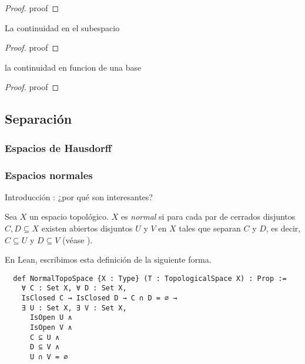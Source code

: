 \begin{proof}
  proof
\end{proof}

\begin{proposition}
  La continuidad en el subespacio
\end{proposition}

\begin{proof}
  proof
\end{proof}

\begin{proposition}
  la continuidad en funcion de una base
\end{proposition}

\begin{proof}
  proof
\end{proof}






\subsection{Separación}



\subsubsection{Espacios de Hausdorff}

\newpage
\subsubsection{Espacios normales}

Introducción : ¿por qué son interesantes?

\begin{definition}
  Sea $X$ un espacio topológico. $X$ es \emph{normal} si para cada par de cerrados disjuntos $C, D \subseteq X$ existen abiertos disjuntos $U$ y $V$ en $X$ tales  que separan $C$ y $D$, es decir, $C \subseteq U$ y $D \subseteq V$ \textnormal{(véase \cite[p. 99]{willard2012general})}.
\end{definition}

En Lean, escribimos esta definición de la siguiente forma.

\begin{lstlisting}
  def NormalTopoSpace {X : Type} (T : TopologicalSpace X) : Prop :=
    ∀ C : Set X, ∀ D : Set X,
    IsClosed C → IsClosed D → C ∩ D = ∅ →
    ∃ U : Set X, ∃ V : Set X,
      IsOpen U ∧
      IsOpen V ∧
      C ⊆ U ∧
      D ⊆ V ∧
      U ∩ V = ∅
\end{lstlisting}

